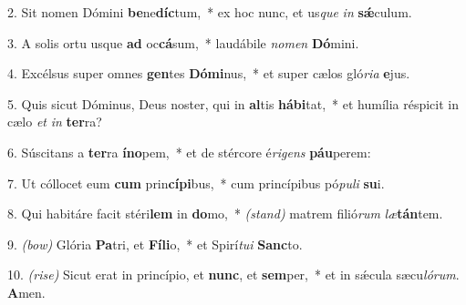 2. Sit nomen Dómini \textbf{be}ne\textbf{díc}tum,~* ex hoc nunc, et us\textit{que} \textit{in} \textbf{sǽ}culum.

3. A solis ortu usque \textbf{ad} oc\textbf{cá}sum,~* laudábile \textit{no}\textit{men} \textbf{Dó}mini.

4. Excélsus super omnes \textbf{gen}tes \textbf{Dó}\textbf{mi}nus,~* et super cælos gló\textit{ri}\textit{a} \textbf{e}jus.

5. Quis sicut Dóminus, Deus noster, qui in \textbf{al}tis \textbf{há}\textbf{bi}tat,~* et humília réspicit in cælo \textit{et} \textit{in} \textbf{ter}ra?

6. Súscitans a \textbf{ter}ra \textbf{ín}\textbf{o}pem,~* et de stércore é\textit{ri}\textit{gens} \textbf{páu}perem:

7. Ut cóllocet eum \textbf{cum} prin\textbf{cí}\textbf{pi}bus,~* cum princípibus pó\textit{pu}\textit{li} \textbf{su}i.

8. Qui habitáre facit stéri\textbf{lem} in \textbf{do}mo,~* {\color{red}\textit{(stand)}} matrem filió\textit{rum} \textit{læ}\textbf{tán}tem.

9. {\color{red}\textit{(bow)}} Glória \textbf{Pa}tri, et \textbf{Fí}\textbf{li}o,~* et Spirí\textit{tu}\textit{i} \textbf{Sanc}to.

10. {\color{red}\textit{(rise)}} Sicut erat in princípio, et \textbf{nunc}, et \textbf{sem}per,~* et in sǽcula sæcu\textit{ló}\textit{rum}. \textbf{A}men.